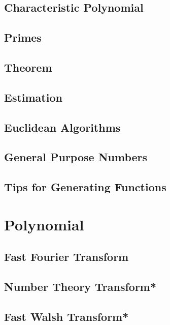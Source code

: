 \subsection{Characteristic Polynomial}

\subsection{Primes}

\subsection{Theorem}

\subsection{Estimation}

\subsection{Euclidean Algorithms}

\subsection{General Purpose Numbers}

\subsection{Tips for Generating Functions}


\section{Polynomial}
\subsection{Fast Fourier Transform}

\subsection{Number Theory Transform*} %

\subsection{Fast Walsh Transform*} %

